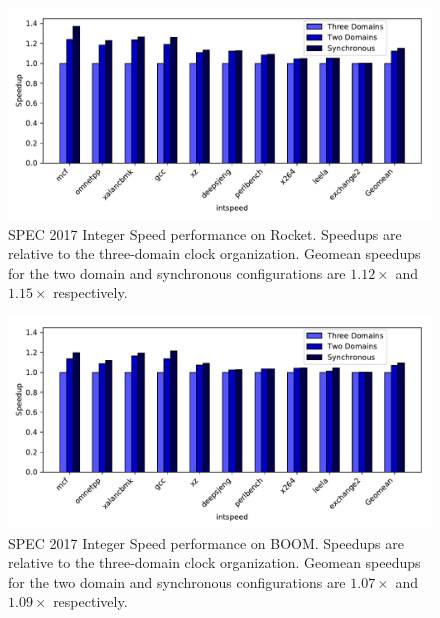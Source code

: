 \begin{figure}[htb]
    \centering
    \includegraphics[width=\columnwidth]{figures/rocket-static-multiclock-speedup.pdf}
    \caption{SPEC 2017 Integer Speed performance on Rocket. Speedups are relative to the three-domain clock organization.
    Geomean speedups for the two domain and synchronous configurations are $1.12\times$ and $1.15\times$ respectively.}


    \label{fig:rocket-static-speedup}
\end{figure}
\begin{figure}[htb]
    \centering
    \includegraphics[width=\columnwidth]{figures/boom-static-multiclock-speedup.pdf}
    \caption{SPEC 2017 Integer Speed performance on BOOM. Speedups are relative to the three-domain clock organization.
    Geomean speedups for the two domain and synchronous configurations are $1.07\times$ and $1.09\times$ respectively.}
    \label{fig:boom-static-speedup}
\end{figure}


